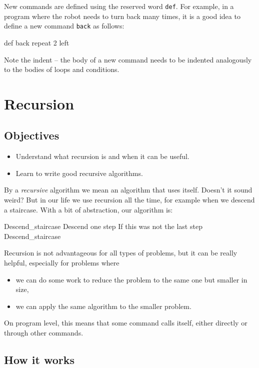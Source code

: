 New commands are defined using the reserved word 
{\tt def}. For example, in a program where the robot needs to turn back
many times, it is a good idea to define a new command {\tt back}
as follows:

\begin{bluecode}
def back
    repeat 2
        left
\end{bluecode}
Note the indent -- the body of a new command needs to be indented 
analogously to the bodies of loops and conditions.


\section{Recursion} \label{sec:recursion}

\subsection{Objectives} 
 
\begin{itemize}
\item Understand what recursion is and when it can be useful.
\item Learn to write good recursive algorithms.
\end{itemize}
By a {\em recursive} algorithm we mean an algorithm that uses itself. Doesn't it sound weird?
But in our life we use recursion all the time, for example when we descend a staircase.
With a bit of abstraction, our algorithm is:

\begin{bluecode}
Descend_staircase
    Descend one step
    If this was not the last step
        Descend_staircase
\end{bluecode}
Recursion is not advantageous for all types of problems, but it can be really 
helpful, especially for problems where 
\begin{itemize}
\item we can do some work to reduce the problem to the same one but smaller in size, 
\item we can apply the same algorithm to the smaller problem. 
\end{itemize}
On program level, this means that some command calls itself, either 
directly or through other commands.

\subsection{How it works} 

